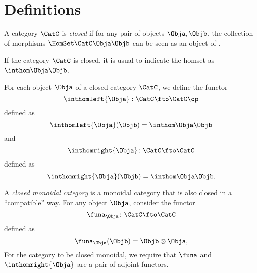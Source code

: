 \section{Definitions}

\begin{definition}
    \label{def:closed-category}
    A category $\CatC$ is \emph{closed} if for any pair of objects $\Obja,\Objb$,
    the collection of morphisms $\HomSet\CatC\Obja\Objb$ can be seen as an object of
    \CatC.

    If the category $\CatC$ is closed, it is usual to indicate the homset as $\inthom\Obja\Objb$.
\end{definition}
\begin{definition}\label{def:internal-hom-functors}
    For each object $\Obja$ of a closed category $\CatC$, we define the functor
    \begin{equation}
        \inthomleft{\Obja}: \CatC \fto \CatC\op
    \end{equation}
    defined as
    \begin{equation}
        \inthomleft{\Obja}(\Objb) = \inthom\Obja\Objb
    \end{equation}
    and
    \begin{equation}
        \inthomright{\Obja} \colon \CatC \fto \CatC
    \end{equation}
    defined as
    \begin{equation}
        \inthomright{\Obja}(\Objb) = \inthom\Obja\Objb.
    \end{equation}
\end{definition}

\begin{definition}
    \label{def:closed-monoidal-category}
    A \emph{closed monoidal category} is a monoidal category that is also closed
    in a ``compatible'' way.
    For any object $\Obja$, consider the functor
    \begin{equation}
        \funa_{\Obja} \colon \CatC \fto \CatC
    \end{equation}
    defined as
    \begin{equation}
        \funa_{\Obja}(\Objb) = \Objb \otimes \Obja,
    \end{equation}
    For the category to be closed monoidal, we require that $\funa$ and $\inthomright{\Obja}$ are a pair of adjoint functors.
\end{definition}

